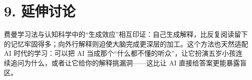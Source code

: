 \documentclass[UTF8,a4paper,11pt]{ctexart}
\begin{document}
\begin{center}
\end{center}

\section*{9. 延伸讨论}
费曼学习法与认知科学中的“生成效应”相互印证：自己生成解释，比反复阅读留下的记忆牢固得多；向外行解释则迫使大脑完成更深层的加工。这个方法也天然适配 AI 时代的学习：可以把 AI 当成那个“什么都不懂的听众”，让它扮演五岁小孩连续追问为什么，或者让它给你的解释挑漏洞——这比让 AI 直接给答案更能暴露盲区。
\end{document}
